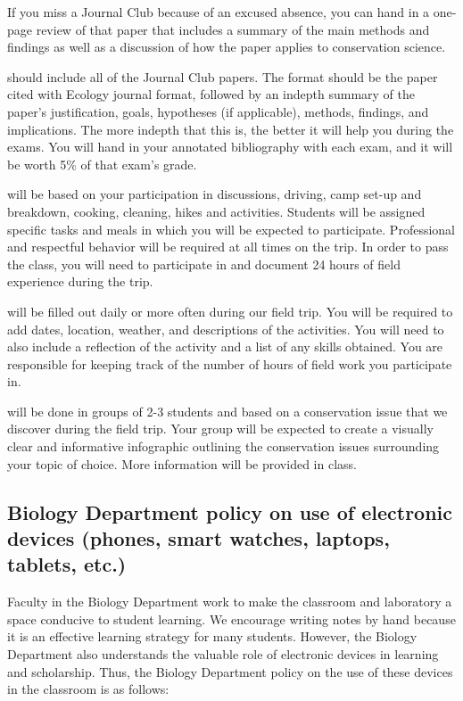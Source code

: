 \documentclass{tufte-handout}
\begin{document}
\begin{fullwidth}
If you miss a Journal Club because of an excused absence, you can hand in a one-page review of that paper that includes a summary of the main methods and findings as well as a discussion of how the paper applies to conservation science. 

 should include all of the Journal Club papers. The format should be the paper cited with Ecology journal format, followed by an indepth summary of the paper's justification, goals, hypotheses (if applicable), methods, findings, and implications. The more indepth that this is, the better it will help you during the exams. You will hand in your annotated bibliography with each exam, and it will be worth 5\% of that exam's grade. 


 will be based on your participation in discussions, driving, camp set-up and breakdown, cooking, cleaning, hikes and activities. Students will be assigned specific tasks and meals in which you will be expected to participate. Professional and respectful behavior will be required at all times on the trip. In order to pass the class, you will need to participate in and document 24 hours of field experience during the trip.

 will be filled out daily or more often during our field trip. You will be required to add dates, location, weather, and descriptions of the activities. You will need to also include a reflection of the activity and a list of any skills obtained. You are responsible for keeping track of the number of hours of field work you participate in.

 will be done in groups of 2-3 students and based on a conservation issue that we discover during the field trip. Your group will be expected to create a visually clear and informative infographic outlining the conservation issues surrounding your topic of choice. More information will be provided in class.


\subsection{Biology Department policy on use of electronic devices (phones, smart watches, laptops, tablets, etc.)}

Faculty in the Biology Department work to make the classroom and laboratory a space conducive to student learning. We encourage writing notes by hand because it is an effective learning strategy for many students. However, the Biology Department also understands the valuable role of electronic devices in learning and scholarship. Thus, the Biology Department policy on the use of these devices in the classroom is as follows:



\end{fullwidth}
\end{document}
